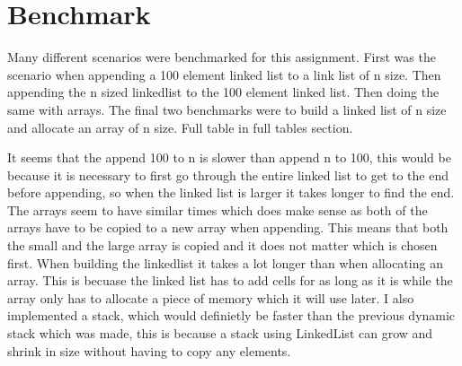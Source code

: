 \documentclass[a4paper,11pt]{article}
\begin{document}
\section*{Benchmark}
Many different scenarios were benchmarked for this assignment. First was the scenario when appending a 100 element linked list to a link list of n size. 
Then appending the n sized linkedlist to the 100 element linked list. Then doing the same with arrays. The final two benchmarks were to build a linked list of n 
size and allocate an array of n size. Full table in full tables section.
\begin{table}[h]
    \begin{center}
    \caption{The result of the benchmark between linked lists and arrays}
    \label{tab:table1}
    \end{center}
\end{table}

{\noindent}It seems that the append 100 to n is slower than append n to 100, this would be because 
it is necessary to first go through the entire linked list to get to the end before appending, so when the linked list is larger
it takes longer to find the end. The arrays seem to have similar times which does make sense as both of the arrays have to be copied to a new array when appending.
This means that both the small and the large array is copied and it does not matter which is chosen first. When building the linkedlist it takes a lot longer than when allocating an array.
This is becuase the linked list has to add cells for as long as it is while the array only has to allocate a piece of memory which it will use later.
I also implemented a stack, which would definietly be faster than the previous dynamic stack which was made, this is because a stack using LinkedList can grow and shrink in size 
without having to copy any elements.
\end{document}
